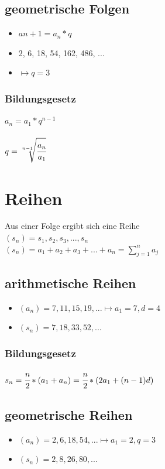 \documentclass[a4paper,12pt]{scrartcl}
\begin{document}
\subsection{geometrische Folgen}
\begin{itemize}
\item $a{n+1} = a_n * q$
\item 2, 6, 18, 54, 162, 486, ...
\item $\mapsto q = 3$
\end{itemize}

\subsubsection{Bildungsgesetz}
$a_n = a_1 * q^{n - 1}$
\\ \\
$q = \sqrt[n-1]{\cfrac{a_n}{a_1}}$


\section{Reihen}
Aus einer Folge ergibt sich eine Reihe \\
$(s_n) = s_1, s_2, s_3, ..., s_n$ \\
$(s_n) = a_1 + a_2 + a_3 + ... + a_n = \sum\limits_{j=1}^n a_j$

\subsection{arithmetische Reihen}
\begin{itemize}
\item $(a_n) = 7, 11, 15, 19, ... \mapsto a_1 = 7, d = 4$ 
\item $(s_n) = 7, 18, 33, 52, ...$
\end{itemize}

\subsubsection{Bildungsgesetz}
$s_n = \cfrac{n}{2} * (a_1 + a_n) = \cfrac{n}{2} * (2a_1 + (n - 1)d)$

\subsection{geometrische Reihen}
\begin{itemize}
\item $(a_n) = 2, 6, 18, 54, ... \mapsto a_1 = 2, q = 3$ 
\item $(s_n) = 2, 8, 26, 80, ...$
\end{itemize}
\end{document}
